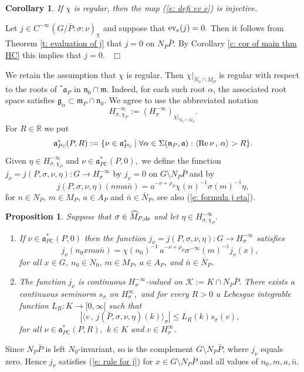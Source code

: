 \documentclass[12pt,a4paper]{article}
\newtheorem{Cor}[Thm]{Corollary}
\newtheorem{Prop}[Thm]{Proposition}
\newenvironment{cor}[0]{\begin{Cor}\noindent}%
{\end{Cor}}
\newenvironment{prop}[0]{\begin{Prop}\noindent}%
{\end{Prop}}
\def\proof{\par\noindent{\it Proof.}{\ }{\ }}
\def\qed{~\hfill\hbox{$\Box$}\medbreak}
\def\itema{\vspace{-1mm}\item[{\rm (a)}]}
\def\itemb{\item[{\rm (b)}]}
\def\msy#1{{\mathbb #1}}
\def\C{{\msy C}}
\def\R{{\msy R}}
\def\ga{\alpha}
\def\gs{\sigma}
\def\gS{\Sigma}
\def\got#1{\mathfrak #1}
\def\fa{{\got a}}
\def\fg{{\got g}}
\def\fm{{\got m}}
\def\fn{{\got n}}
\def\to{\rightarrow}
\def\Re{{\rm Re}\,}
\def\inp#1#2{\langle#1\,,\,#2\rangle}
\def\iC{{\scriptscriptstyle \C}}
\def\cK{{\mathcal K}}
\numberwithin{Thm}{section}
\numberwithin{equation}{section}
\def\ev{{\rm ev}}
\def\faPdc{{\fa_{P\iC}^*}}
\numberwithin{equation}{section}
\def\faPdc{\fa_{P\iC}^*}
\def\MPds{\widehat M_{P,\rm ds}}
\def\cchi{\chi}
\begin{document}
\begin{cor}
\label{c: ev is injective}
If $\cchi$ is regular, then the map (\ref{e: defi ev e}) is injective.
\end{cor}

\proof
Let $j \in C^{-\infty}(G/\bar P:\gs: \nu)_\cchi$ and suppose that $\ev_e(j) = 0.$ 
Then it follows from Theorem \ref{t: evaluation of j} that 
$j = 0$ on $N_P \bar P.$ By Corollary \ref{c: cor of main thm HC} this implies 
that $j = 0.$ 
\qed

We retain the assumption that $\chi$ is regular. Then $\chi|_{N_0\cap M_P}$
is regular with respect to the roots of ${}^*\fa_P$ in $\fn_0 \cap \fm.$ 
Indeed, for each such root $\ga$, the associated root space satisfies $\fg_\ga \subset \fm_P\cap \fn_0. $ We agree to use the abbreviated notation
\begin{equation}
\label{e: abbreviation Whittaker data}
H_{\gs,\cchi_P}^{-\infty}:= (H_\gs^{-\infty})_{\cchi|_{N_0 \cap M_P}}.
\end{equation}
For $R \in \R$ we put
\begin{equation}
\label{e: defi faPR}
\faPdc(P,  R) :=  \{\nu \in \faPdc \mid \forall \ga \in \gS(\fn_P,\fa): \inp{\Re \nu}{\ga} > R\}.
\end{equation}
Given $\eta \in H_{\gs,\cchi_P}^{-\infty}$ and $\nu \in \faPdc(P,0),$ we define the function 
$
j_\nu  = j(P, \gs ,  \nu, \eta): G  \to  H_\gs^{-\infty}
$
by $j_\nu  = 0$ on $G \setminus N_P \bar P$ and by 
\begin{equation}
\label{e: defi j P gs nu eta}
j(P, \gs, \nu, \eta) (n m a \bar n ) =  a^{- \nu + \rho_P} \cchi(n)^{-1} \gs(m)^{-1} \eta,
\end{equation}
for $n \in N_P$, $  m \in M_P$,  $a \in A_P$ and $\bar n \in \bar N_P$, 
see also (\ref{e: formula j eta}). 

\begin{prop}
\label{p: integrability of j}
Suppose that $\gs \in \MPds$ and let $\eta \in H_{\gs,\cchi_P}^{-\infty}.$
\begin{enumerate}
\itema
If $\nu\in \faPdc(P,0)$ then the function $j_\nu = 
 j(P, \gs, \nu, \eta): G \to H_\gs^{-\infty}$  
satisfies 
 \begin{equation}
 \label{e: rule for j}
 j_\nu(n_0 x m a \bar n) =  \cchi(n_0)^{-1} \,a^{-\nu + \rho_P} \gs^{-\infty}(m)^{-1} j_\nu(x) , 
 \end{equation}
 for all $x \in G$,  $n_0 \in N_0$,  $m \in M_P$,  $ a \in A_P$, and $\bar n \in \bar N_P.$ 
 \itemb
The function $j_\nu$ is continuous $H_\gs^{-\infty}$-valued on $\cK:= K\cap N_P \bar P.$ There exists a continuous seminorm 
$s_\gs$ on $H_\gs^{\infty},$ and for every $R > 0$ a  Lebesgue integrable 
function $L_R: K \to [0,\infty[$ such that
$$ 
|\inp{v}{j(\bar P, \gs, \nu, \eta)(k)}_\gs | \leq L_R(k) s_\gs(v),
$$%
for all $\nu \in \faPdc(P,R),$ $k \in K$ and $v \in H_\gs^\infty.$ 
\end{enumerate}
\end{prop}
%
 \proof 
Since $N_P \bar P$ is left $N_0$-invariant, 
so is the complement $G\setminus N_P \bar P$, 
where $j_\nu$ equals zero. Hence $j_\nu$ satisfies (\ref{e: rule for j}) for $x\in G\setminus N_P\bar P$ and all values of $n_0, m, a,\bar n.$ 
\end{document}
